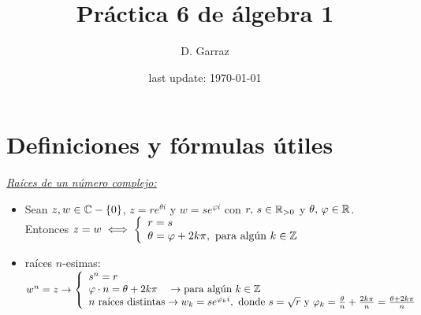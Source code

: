 \documentclass[12pt,a4paper, spanish]{article}
\begin{document}

\pagestyle{empty} %

\title{Práctica 6 de álgebra 1} %
\author{D. Garraz} %
\date{last update: \today} %

\maketitle  %

\section{Definiciones y fórmulas útiles}
\textit{\underline{Raíces de un número complejo: }}
\begin{itemize}
	\item Sean $z, w \en \complejos -\set{0}$, $z = re^{\theta i}$ y $w = se^{\varphi i }$ con $r,\, s \en \reales_{>0}$
	      y $\theta,\, \varphi \en \reales$.\\ Entonces $z = w \sisolosi
		      \llave{l}{
			      r = s\\
			      \theta = \varphi + 2 k\pi,\ \text{para algún } k \en \enteros
		      }$
	\item raíces $n$-esimas: $w^n = z
		      \to
		      \llave{l}{
		      s^n = r \\
		      \varphi \cdot n = \theta + 2 k \pi \quad\to \text{para algún $k\en \enteros$}\\
		      \text{$n$ raíces distintas} \to w_k=se^{\varphi_k i}, \text{ donde } s = \sqrt{r} \text{ y }
		      \varphi_k = \frac{\theta}{n} + \frac{2k\pi}{n} = \frac{\theta + 2k\pi}{n}


		      }$
\end{itemize}
\end{document}
